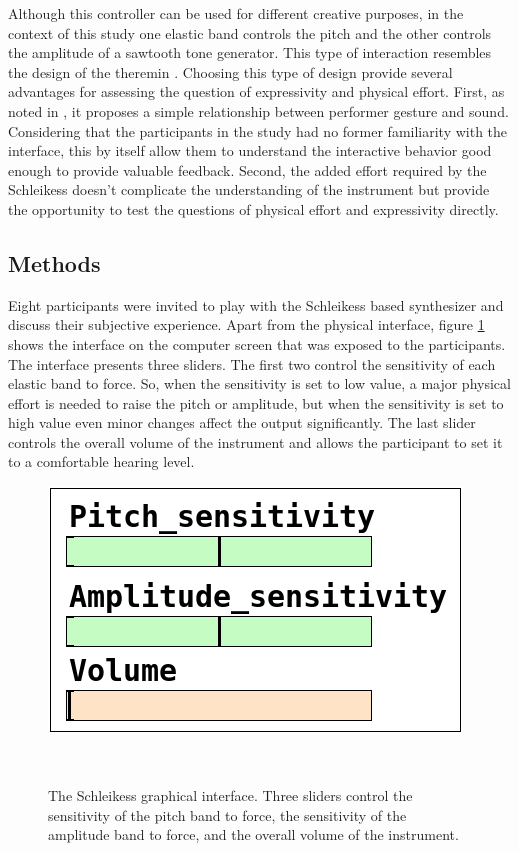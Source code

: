 \documentclass{sigchi}
\begin{document}
Although this controller can be used for different creative purposes, in the context of this study one elastic band controls the pitch and the other controls the amplitude of a sawtooth tone generator.
This type of interaction resembles the design of the theremin \cite{Theremin1996}.
Choosing this type of design provide several advantages for assessing the question of expressivity and physical effort.
First, as noted in \cite{Fyans2010}, it proposes a simple relationship between performer gesture and sound.
Considering that the participants in the study had no former familiarity with the interface, this by itself allow them to understand the interactive behavior good enough to provide valuable feedback.
Second, the added effort required by the Schleikess doesn't complicate the understanding of the instrument but provide the opportunity to test the questions of physical effort and expressivity directly.

\subsection{Methods}

Eight participants were invited to play with the Schleikess based synthesizer and discuss their subjective experience.
Apart from the physical interface, figure \ref{fig:pd-interface} shows the interface on the computer screen that was exposed to the participants.
The interface presents three sliders.
The first two control the sensitivity of each elastic band to force.
So, when the sensitivity is set to low value, a major physical effort is needed to raise the pitch or amplitude, but when the sensitivity is set to high value even minor changes affect the output significantly.
The last slider controls the overall volume of the instrument and allows the participant to set it to a comfortable hearing level.

\begin{figure}
  \centering
  \includegraphics[width=0.9\columnwidth]{figures/pd_interface}
  \caption{The Schleikess graphical interface. Three sliders control the sensitivity of the pitch band to force, the sensitivity of the amplitude band to force, and the overall volume of the instrument.}~\label{fig:pd-interface}
\end{figure}
\end{document}
